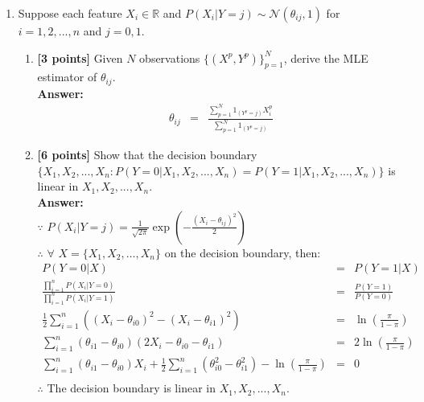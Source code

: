 \documentclass{article}
\begin{document}
\begin{enumerate}
\item Suppose each feature $X_i\in\mathbb{R}$ and  $P(X_i|Y=j)\sim \mathcal{N}(\theta_{ij}, 1)$ for $i=1,2,...,n$ and $j=0,1$.

\begin{enumerate}
\item\textbf{[3 points]} Given $N$ observations $\{(X^{p},Y^{p})\}_{p=1}^N$, derive the MLE estimator of $\theta_{ij}$.\\
\textbf{Answer:}\\

\begin{equation}
\begin{array}{rcl}
\theta_{ij} & = & \frac{\sum_{p=1}^{N}1_{(Y^p=j)}X_i^p}{\sum_{p=1}^{N}1_{(Y^p=j)}}
\end{array}
\end{equation}

\item\textbf{[6 points]} Show that the decision boundary $\{X_1,X_2,...,X_n: P(Y=0|X_1,X_2,...,X_n) = P(Y=1|X_1,X_2,...,X_n)\}$ is linear in $X_1,X_2,...,X_n$.\\
\textbf{Answer:}\\

$\because$ $P(X_i|Y=j)=\frac{1}{\sqrt{2\pi}}\exp(-\frac{(X_i-\theta_{ij})^2}{2})$\\
$\therefore$ $\forall$ $X=\{X_1,X_2,\dots,X_n\}$ on the decision boundary, then:
\begin{equation}
\nonumber
\begin{array}{rcl}
P(Y=0|X) & = & P(Y=1|X) \\
\frac{\prod_{i=1}^{n}P(X_i|Y=0)}{\prod_{i=1}^{n}P(X_i|Y=1)} & = & \frac{P(Y=1)}{P(Y=0)} \\
\frac{1}{2}\sum_{i=1}^{n}((X_i-\theta_{i0})^2-(X_i-\theta_{i1})^2) & = & \ln(\frac{\pi}{1-\pi}) \\
\sum_{i=1}^{n}(\theta_{i1}-\theta_{i0})(2X_i-\theta_{i0}-\theta_{i1}) & = & 2\ln(\frac{\pi}{1-\pi}) \\
\sum_{i=1}^{n}(\theta_{i1}-\theta_{i0})X_i + \frac{1}{2}\sum_{i=1}^{n}(\theta_{i0}^2-\theta_{i1}^2)-\ln(\frac{\pi}{1-\pi}) & = & 0 \\
\end{array}
\end{equation}
$\therefore$ The decision boundary is linear in $X_1,X_2,...,X_n$.

\end{enumerate}

\end{enumerate}
\end{document}

